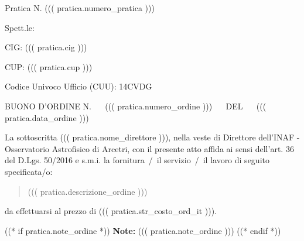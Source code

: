 \documentclass[a4paper,12pt]{letter}
\begin{document}
\topaddr

{\small Pratica N. ((( pratica.numero_pratica ))) }
\vspace{.4cm}

\begin{flushright}
\begin{minipage}{12cm}
Spett.le:\\
\end{minipage}
\end{flushright}
\vspace{5mm}

CIG: ((( pratica.cig ))) 

CUP: ((( pratica.cup )))

Codice Univoco Ufficio (CUU): 14CVDG

BUONO D'ORDINE N. ~~ ((( pratica.numero_ordine ))) ~~ DEL ~~ ((( pratica.data_ordine )))

La sottoscritta ((( pratica.nome_direttore ))), 
nella veste di Direttore dell'INAF - Osservatorio Astrofisico di Arcetri,
con il presente atto affida ai sensi dell'art. 36 del D.Lgs. 50/2016 e s.m.i.
la fornitura~/~il servizio~/~il lavoro di seguito specificata/o:

\begin{quote}
((( pratica.descrizione_ordine )))
\end{quote}

da effettuarsi al prezzo di ((( pratica.str_costo_ord_it ))).

((* if pratica.note_ordine *))
{\bf Note:} ((( pratica.note_ordine )))
((* endif *))
\vspace{1cm}
\end{document}
